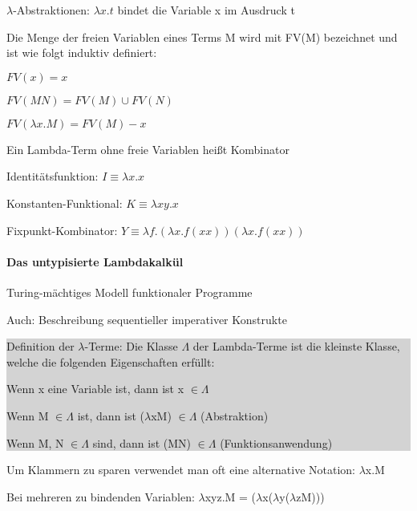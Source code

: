 \documentclass[10pt]{article}
\begin{document}
$\lambda$-Abstraktionen: $\lambda x. t$ bindet die Variable x im Ausdruck t

Die Menge der freien Variablen eines Terms M wird mit FV(M) bezeichnet und ist wie folgt induktiv definiert:
\begin{itemize*}
  \item $FV(x)={x}$
  \item $FV(MN) = FV(M) \cup FV(N)$
  \item $FV(\lambda x.M) = FV(M) - {x}$
\end{itemize*}
Ein Lambda-Term ohne freie Variablen heißt Kombinator
\begin{itemize*}
  \item Identitätsfunktion: $I \equiv  \lambda x.x$
  \item Konstanten-Funktional: $K \equiv \lambda xy.x$
  \item Fixpunkt-Kombinator: $Y \equiv \lambda f.(\lambda x. f (x x)) (\lambda x. f (x x))$
\end{itemize*}

\paragraph{Das untypisierte Lambdakalkül}
\begin{itemize*}
  \item Turing-mächtiges Modell funktionaler Programme
  \item Auch: Beschreibung sequentieller imperativer Konstrukte
\end{itemize*}
\subitem\colorbox{lightgray}{
  \begin{minipage}[h]{0.9\linewidth}
    Definition der $\lambda$-Terme: 
    Die Klasse $\Lambda$ der Lambda-Terme ist die kleinste Klasse, welche die folgenden Eigenschaften erfüllt: 
    \begin{itemize*}
      \item Wenn x eine Variable ist, dann ist x $\in \Lambda$
      \item Wenn M $\in \Lambda$ ist, dann ist ($\lambda$xM) $\in \Lambda$ (Abstraktion)
      \item Wenn M, N $\in \Lambda$ sind, dann ist (MN) $\in \Lambda$ (Funktionsanwendung)
      
    \end{itemize*}
    
  \end{minipage}
}
\begin{itemize*}
  \item Um Klammern zu sparen verwendet man oft eine alternative Notation: $\lambda$x.M
  \item Bei mehreren zu bindenden Variablen: $\lambda$xyz.M = ($\lambda$x($\lambda$y($\lambda$zM)))
\end{itemize*}
\end{document}
